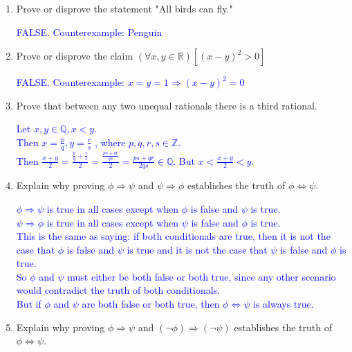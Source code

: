 \documentclass[13.5pt]{article}
\begin{document}
\begin{enumerate}

\item{Prove or disprove the statement "All birds can fly."}

\textcolor{blue} {FALSE. Counterexample: Penguin}

\item{Prove or disprove the claim \((\forall x,y \in\mathbb{R})[(x-y)^2 > 0]\)}

\textcolor{blue} {FALSE. Counterexample: \(x=y=1 \Rightarrow (x-y)^2 = 0\)}

\item{Prove that between any two unequal rationals there is a third rational.}

\textcolor{blue} {Let \(x, y \in\mathbb{Q}, x<y. \)}\\
\textcolor{blue} {Then \(x=\frac{p}{q}, y=\frac{r}{s}\) , where \(p,q,r,s \in\mathbb{Z}.\)}\\
\textcolor{blue} {Then \( \frac{x+y}{2} = \frac{\frac{p}{q}+\frac{r}{s}}{2} = \frac{\frac{ps+qr}{qs}}{2} = \frac{ps+qr}{2qs} \in\mathbb{Q}.\) But \( x< \frac{x+y}{2} <y \). }

\item{Explain why proving \(\phi \Rightarrow \psi \) and \(\psi \Rightarrow \phi \) establishes the truth of \(\phi \Leftrightarrow \psi \). }

\textcolor{blue} {\( \phi \Rightarrow \psi \) is true in all cases except when \(\phi\) is false and \(\psi \) is true. }\\
\textcolor{blue} {\( \psi \Rightarrow \phi \) is true in all cases except when \(\psi\) is false and \(\phi \) is true. }\\
\textcolor{blue} {This is the same as saying: if both conditionals are true, then it is not the case that \(\phi\) is false and \(\psi \) is true and it is not the case that \(\psi\) is false and \(\phi \) is true. }\\
\textcolor{blue} {So \(\phi\) and \(\psi \) must either be both false or both true, since any other scenario would contradict the truth of both conditionals. }\\
\textcolor{blue} {But if \(\phi\) and \(\psi \) are both false or both true, then \(\phi \Leftrightarrow \psi \) is always true. }

\item{Explain why proving \(\phi \Rightarrow \psi \) and \( (\neg \phi) \Rightarrow (\neg \psi) \) establishes the truth of \(\phi \Leftrightarrow \psi \). }


\end{enumerate}
\end{document}
